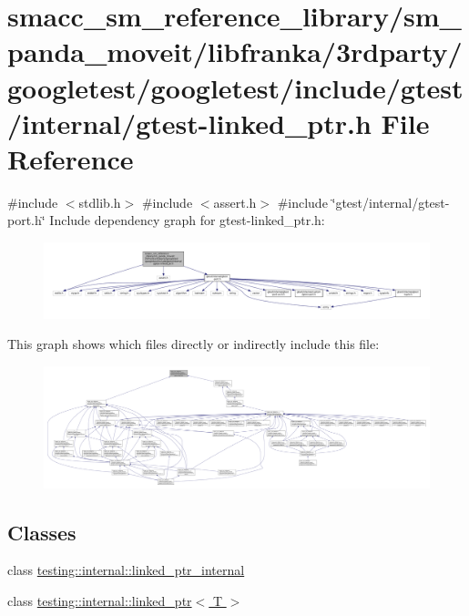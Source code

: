 \hypertarget{gtest-linked__ptr_8h}{}\section{smacc\+\_\+sm\+\_\+reference\+\_\+library/sm\+\_\+panda\+\_\+moveit/libfranka/3rdparty/googletest/googletest/include/gtest/internal/gtest-\/linked\+\_\+ptr.h File Reference}
\label{gtest-linked__ptr_8h}
{\ttfamily \#include $<$stdlib.\+h$>$}\newline
{\ttfamily \#include $<$assert.\+h$>$}\newline
{\ttfamily \#include \char`\"{}gtest/internal/gtest-\/port.\+h\char`\"{}}\newline
Include dependency graph for gtest-\/linked\+\_\+ptr.h\+:
\nopagebreak
\begin{figure}[H]
\begin{center}
\leavevmode
\includegraphics[width=350pt]{gtest-linked__ptr_8h__incl}
\end{center}
\end{figure}
This graph shows which files directly or indirectly include this file\+:
\nopagebreak
\begin{figure}[H]
\begin{center}
\leavevmode
\includegraphics[width=350pt]{gtest-linked__ptr_8h__dep__incl}
\end{center}
\end{figure}
\subsection*{Classes}
\begin{DoxyCompactItemize}
\item 
class \hyperlink{classtesting_1_1internal_1_1linked__ptr__internal}{testing\+::internal\+::linked\+\_\+ptr\+\_\+internal}
\item 
class \hyperlink{classtesting_1_1internal_1_1linked__ptr}{testing\+::internal\+::linked\+\_\+ptr$<$ T $>$}
\end{DoxyCompactItemize}
